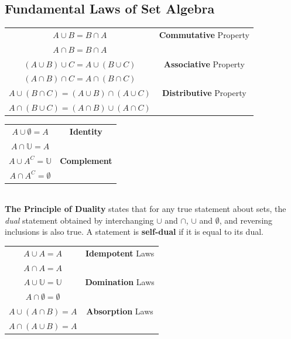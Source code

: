     \subsection{Fundamental Laws of Set Algebra}
        \begin{center}
            \begin{tabular}{|c|c|}
                \hline
                $A\cup B=B \cap A$ & \textbf{Commutative} Property \\
                $A\cap B = B\cap A$ & \\ \hline
                $(A\cup B)\cup C = A\cup (B\cup C)$ & \textbf{Associative} Property \\
                $(A\cap B)\cap C = A\cap (B\cap C)$ & \\ \hline
                $A\cup (B \cap C) = (A\cup B) \cap (A\cup C)$ & \textbf{Distributive} Property \\
                $A\cap (B \cup C) = (A\cap B) \cup (A\cap C)$ & \\ \hline
            \end{tabular}

            \begin{tabular}{|c|c|}
                \hline
                $A \cup \emptyset = A$ & \textbf{Identity} \\
                $A \cap \mathbb{U}=A$ & \\ \hline
                $A \cup A^C = \mathbb{U}$ & \textbf{Complement} \\
                $A \cap A^C = \emptyset$ & \\ \hline
            \end{tabular}
        \end{center}\\

        \noindent \color{purple} \textbf{The Principle of Duality} \color{black} states that
        for any true statement about sets, the \textit{dual }statement obtained by interchanging
        $\cup$ and $\cap$, $\cup$ and $\emptyset$, and reversing inclusions is also true. A
        statement is \textbf{self-dual} if it is equal to its dual. \\

        \begin{center}
            \begin{tabular}{|c|c|}
                \hline
                $A\cup A=A$ & \textbf{Idempotent} Laws \\
                $A \cap A = A$ & \\ \hline
                $A\cup \mathbb{U}=\mathbb{U}$ & \textbf{Domination} Laws\\
                $A\cap \emptyset = \emptyset$ & \\ \hline
                $A\cup (A \cap B) = A$  & \textbf{Absorption} Laws \\
                $A\cap (A \cup B) = A$ & \\ \hline
            \end{tabular}
        \end{center}




